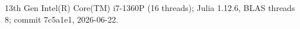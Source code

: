 13th Gen Intel(R) Core(TM) i7-1360P (16 threads); Julia 1.12.6, BLAS threads 8; commit 7c5a1e1, 2026-06-22.